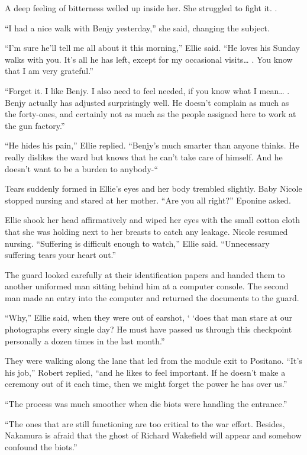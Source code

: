 \documentclass[]{article}
\begin{document}
{{A deep feeling of bitterness welled up inside her. She struggled to fight it. .

“I had a nice walk with Benjy yesterday,” she said, changing the subject.

“I’m sure he’ll tell me all about it this morning,” Ellie said. “He loves his Sunday walks with you. It’s all he has left, except for my occasional visits… . You know that I am very grateful.”

“Forget it. I like Benjy. I also need to feel needed, if you know what I mean… . Benjy actually has adjusted surprisingly well. He doesn’t complain as much as the forty-ones, and certainly not as much as the people assigned here to work at the gun factory.”

“He hides his pain,” Ellie replied. “Benjy’s much smarter than anyone thinks. He really dislikes the ward but knows that he can’t take care of himself. And he doesn’t want to be a burden to anybody-“

Tears suddenly formed in Ellie’s eyes and her body trembled slightly. Baby Nicole stopped nursing and stared at her mother. “Are you all right?” Eponine asked.

Ellie shook her head affirmatively and wiped her eyes with the small cotton cloth that she was holding next to her breasts to catch any leakage. Nicole resumed nursing. “Suffering is difficult enough to watch,” Ellie said. “Unnecessary suffering tears your heart out.”

The guard looked carefully at their identification papers and handed them to another uniformed man sitting behind him at a computer console. The second man made an entry into the computer and returned the documents to the guard.

“Why,” Ellie said, when they were out of earshot, ‘ ‘does that man stare at our photographs every single day? He must have passed us through this checkpoint personally a dozen times in the last month.”

They were walking along the lane that led from the module exit to Positano. “It’s his job,” Robert replied, “and he likes to feel important. If he doesn’t make a ceremony out of it each time, then we might forget the power he has over us.”

“The process was much smoother when die biots were handling the entrance.”

“The ones that are still functioning are too critical to the war effort. Besides, Nakamura is afraid that the ghost of Richard Wakefield will appear and somehow confound the biots.”

}}
\end{document}
